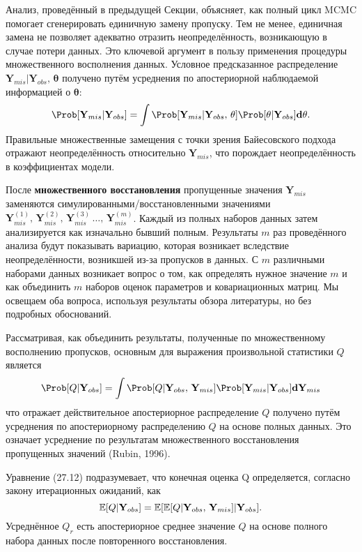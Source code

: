 Анализ, проведённый в предыдущей Секции, объясняет, как полный цикл MCMC помогает сгенерировать единичную замену пропуску. Тем не менее, единичная замена не позволяет адекватно отразить неопределённость, возникающую в случае потери данных. Это ключевой аргумент в пользу применения процедуры множественного восполнения данных. Условное предсказанное распределение $\mathbf{Y}_{mis}|\mathbf{Y}_{obs}, \, \mathbf{\theta}$ получено путём усреднения по апостериорной наблюдаемой информацией о $\mathbf{\theta}$:
\[
\Prob[\mathbf{Y}_{mis}|\mathbf{Y}_{obs}] = \int \Prob[\mathbf{Y}_{mis}|\mathbf{Y}_{obs}, \, \mathbf{\theta}] \Prob[\mathbf{\theta}|\mathbf{Y}_{obs}]\mathbf{d\theta}.
\]
Правильные множественные замещения с точки зрения Байесовского подхода отражают неопределённость относительно $\mathbf{Y}_{mis}$, что порождает неопределённость в коэффициентах модели.

После {\bf множественного восстановления} пропущенные значения $\mathbf{Y}_{mis}$ заменяются симулированными/восстановленными значениями $\mathbf{Y}_{mis}^{(1)}, \, \mathbf{Y}_{mis}^{(2)}, \, \mathbf{Y}_{mis}^{(3)}\, \dots, \, \mathbf{Y}_{mis}^{(m)}$. Каждый из полных наборов данных затем анализируется как изначально бывший полным. Результаты $m$ раз проведённого анализа будут показывать вариацию, которая возникает вследствие неопределённости, возникшей из-за пропусков в данных. С $m$ различными наборами данных возникает вопрос о том, как определять нужное значение $m$ и как объединить $m$ наборов оценок параметров и ковариационных матриц. Мы освещаем оба вопроса, используя результаты обзора литературы, но без подробных обоснований.

Рассматривая, как объединить результаты, полученные по множественному восполнению пропусков, основным для выражения произвольной статистики $Q$ является
\begin{equation}
\Prob[Q|\mathbf{Y}_{obs}] = 
\int \Prob[Q|\mathbf{Y}_{obs}, \, \mathbf{Y}_{mis}] 
\Prob[\mathbf{Y}_{mis}|\mathbf{Y}_{obs}]\mathbf{d}\mathbf{Y}_{mis}
\end{equation}
что отражает действительное апостериорное распределение $Q$ получено путём усреднения по апостериорному распределению $Q$ на основе полных данных. Это означает усреднение  по результатам множественного восстановления пропущенных значений (Rubin, 1996).

Уравнение (27.12) подразумевает, что конечная оценка Q определяется, согласно закону итерационных ожиданий, как
\begin{equation}
\mathbb{E}[Q|\mathbf{Y}_{obs}]=\mathbb{E}[\mathbb{E}[Q|\mathbf{Y}_{obs}, \, \mathbf{Y}_{mis}]|\mathbf{Y}_{obs}].
\end{equation}
Усреднённое $Q_r$ есть апостериорное среднее значение $Q$ на основе полного набора данных после повторенного восстановления.

